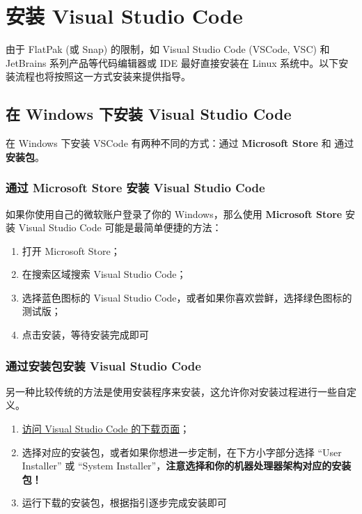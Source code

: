\chapter{安装 Visual Studio Code}
\label{Installation_VSCode}

由于 FlatPak (或 Snap) 的限制，如 Visual Studio Code (VSCode, VSC) 和 JetBrains 系列产品等代码编辑器或 IDE 最好直接安装在 Linux 系统中。以下安装流程也将按照这一方式安装来提供指导。

\section{在 Windows 下安装 Visual Studio Code}
\label{Installation_VSCode_Windows}

在 Windows 下安装 VSCode 有两种不同的方式：通过 \textbf{Microsoft Store} 和 通过 \textbf{安装包}。

\subsection{通过 Microsoft Store 安装 Visual Studio Code}
\label{Installation_VSCode_Windows_Store}

如果你使用自己的微软账户登录了你的 Windows，那么使用 \textbf{Microsoft Store} 安装 Visual Studio Code 可能是最简单便捷的方法：
\begin{enumerate}
    \item 打开 Microsoft Store；
    \item 在搜索区域搜索 Visual Studio Code；
    \item 选择蓝色图标的 Visual Studio Code，或者如果你喜欢尝鲜，选择绿色图标的测试版；
    \item 点击安装，等待安装完成即可
\end{enumerate}

\subsection{通过安装包安装 Visual Studio Code}
\label{Installation_VSCode_Windows_Installer}

另一种比较传统的方法是使用安装程序来安装，这允许你对安装过程进行一些自定义。
\begin{enumerate}
    \item \href{https://code.visualstudio.com/download}{访问 Visual Studio Code 的下载页面}；
    \item 选择对应的安装包，或者如果你想进一步定制，在下方小字部分选择 ``User Installer'' 或 ``System Installer''，\textbf{注意选择和你的机器处理器架构对应的安装包！}
    \item 运行下载的安装包，根据指引逐步完成安装即可
\end{enumerate}


